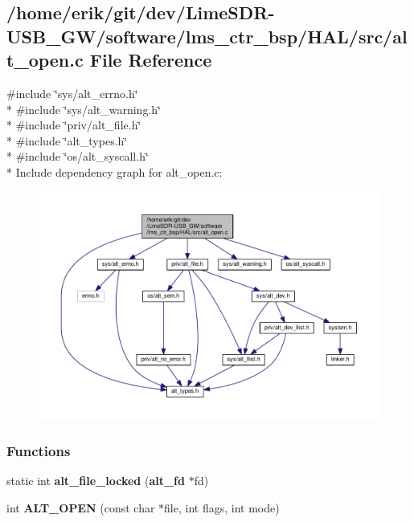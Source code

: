 \subsection{/home/erik/git/dev/\+Lime\+S\+D\+R-\/\+U\+S\+B\+\_\+\+G\+W/software/lms\+\_\+ctr\+\_\+bsp/\+H\+A\+L/src/alt\+\_\+open.c File Reference}
\label{alt__open_8c}
{\ttfamily \#include \char`\"{}sys/alt\+\_\+errno.\+h\char`\"{}}\\*
{\ttfamily \#include \char`\"{}sys/alt\+\_\+warning.\+h\char`\"{}}\\*
{\ttfamily \#include \char`\"{}priv/alt\+\_\+file.\+h\char`\"{}}\\*
{\ttfamily \#include \char`\"{}alt\+\_\+types.\+h\char`\"{}}\\*
{\ttfamily \#include \char`\"{}os/alt\+\_\+syscall.\+h\char`\"{}}\\*
Include dependency graph for alt\+\_\+open.\+c\+:
\nopagebreak
\begin{figure}[H]
\begin{center}
\leavevmode
\includegraphics[width=350pt]{d3/daf/alt__open_8c__incl}
\end{center}
\end{figure}
\subsubsection*{Functions}
\begin{DoxyCompactItemize}
\item 
static int {\bf alt\+\_\+file\+\_\+locked} ({\bf alt\+\_\+fd} $\ast$fd)
\item 
int {\bf A\+L\+T\+\_\+\+O\+P\+EN} (const char $\ast$file, int flags, int mode)
\end{DoxyCompactItemize}
